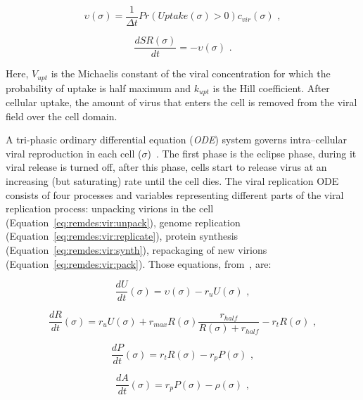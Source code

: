\begin{equation}\label{eq:remdes:vir:uptake}
    \upsilon(\sigma) = \frac{1}{\Delta t} Pr(Uptake(\sigma)>0) c_{vir}(\sigma)\,\,,
\end{equation}

\begin{equation}\label{eq:remdes:vir:surf_recep}
\frac{dSR(\sigma)}{dt} = - \upsilon(\sigma)\,\,.
\end{equation}

\noindent Here, $V_{upt}$ is the Michaelis
 constant of the viral concentration for which the probability of uptake is half maximum and $k_{upt}$ is the Hill coefficient. After cellular uptake, the amount of virus that enters the cell is removed from the viral field over the cell domain.

A tri-phasic ordinary differential equation (\emph{ODE}) system governs intra--cellular viral reproduction in each cell ($\sigma$)~\cite{sego_modular_2020}. 
The first phase is the eclipse phase, during it viral release is turned off,
after this phase,  cells start to release virus at an increasing (but saturating) rate until the cell dies. The viral replication ODE consists of four processes and variables representing different parts of the viral replication process: unpacking virions in the cell (Equation~\ref{eq:remdes:vir:unpack}), genome replication (Equation~\ref{eq:remdes:vir:replicate}), protein synthesis (Equation~\ref{eq:remdes:vir:synth}), repackaging of new virions (Equation~\ref{eq:remdes:vir:pack}). Those equations, from~\cite{sego_modular_2020}, are:

\begin{equation}\label{eq:remdes:vir:unpack}
    \frac{dU}{dt}(\sigma) = \upsilon(\sigma) - r_uU(\sigma)\,\,,
\end{equation}

\begin{equation}\label{eq:remdes:vir:replicate}
    \frac{dR}{dt}(\sigma) = r_u U(\sigma) + r_{max}R(\sigma)\frac{r_{half}}{R(\sigma)+r_{half}} - r_tR(\sigma)\,\,,
\end{equation}

\begin{equation}\label{eq:remdes:vir:synth}
    \frac{dP}{dt}(\sigma) = r_t R(\sigma) - r_p P(\sigma)\,\,,
\end{equation}

\begin{equation}\label{eq:remdes:vir:pack}
    \frac{dA}{dt}(\sigma) = r_p P(\sigma) - \rho(\sigma)\,\,,
\end{equation}

